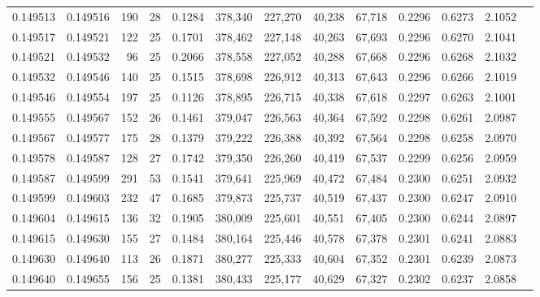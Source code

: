\begin{tabular}{rrrrrrrrrrrrr}
0.149513 & 0.149516 & 190 &  28 &                                     0.1284 & 378,340 & 227,270 &  40,238 &  67,718 & 0.2296 & 0.6273 & 2.1052 \\
0.149517 & 0.149521 & 122 &  25 &                                     0.1701 & 378,462 & 227,148 &  40,263 &  67,693 & 0.2296 & 0.6270 & 2.1041 \\
0.149521 & 0.149532 &  96 &  25 &                                     0.2066 & 378,558 & 227,052 &  40,288 &  67,668 & 0.2296 & 0.6268 & 2.1032 \\
0.149532 & 0.149546 & 140 &  25 &                                     0.1515 & 378,698 & 226,912 &  40,313 &  67,643 & 0.2296 & 0.6266 & 2.1019 \\
0.149546 & 0.149554 & 197 &  25 &                                     0.1126 & 378,895 & 226,715 &  40,338 &  67,618 & 0.2297 & 0.6263 & 2.1001 \\
0.149555 & 0.149567 & 152 &  26 &                                     0.1461 & 379,047 & 226,563 &  40,364 &  67,592 & 0.2298 & 0.6261 & 2.0987 \\
0.149567 & 0.149577 & 175 &  28 &                                     0.1379 & 379,222 & 226,388 &  40,392 &  67,564 & 0.2298 & 0.6258 & 2.0970 \\
0.149578 & 0.149587 & 128 &  27 &                                     0.1742 & 379,350 & 226,260 &  40,419 &  67,537 & 0.2299 & 0.6256 & 2.0959 \\
0.149587 & 0.149599 & 291 &  53 &                                     0.1541 & 379,641 & 225,969 &  40,472 &  67,484 & 0.2300 & 0.6251 & 2.0932 \\
0.149599 & 0.149603 & 232 &  47 &                                     0.1685 & 379,873 & 225,737 &  40,519 &  67,437 & 0.2300 & 0.6247 & 2.0910 \\
0.149604 & 0.149615 & 136 &  32 &                                     0.1905 & 380,009 & 225,601 &  40,551 &  67,405 & 0.2300 & 0.6244 & 2.0897 \\
0.149615 & 0.149630 & 155 &  27 &                                     0.1484 & 380,164 & 225,446 &  40,578 &  67,378 & 0.2301 & 0.6241 & 2.0883 \\
0.149630 & 0.149640 & 113 &  26 &                                     0.1871 & 380,277 & 225,333 &  40,604 &  67,352 & 0.2301 & 0.6239 & 2.0873 \\
0.149640 & 0.149655 & 156 &  25 &                                     0.1381 & 380,433 & 225,177 &  40,629 &  67,327 & 0.2302 & 0.6237 & 2.0858 \\

\end{tabular}
